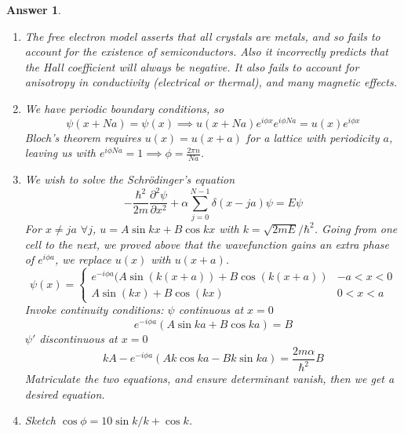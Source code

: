 \documentclass[a4paper]{article}
\newtheorem{ans}{Answer}[subsection]
\theoremstyle{new}
\begin{document}
\begin{ans}\leavevmode
\begin{enumerate}[label=(\alph*)]
\item The free electron model asserts that all crystals are metals, and so fails to account for the existence of semiconductors. Also it incorrectly predicts that the Hall coefficient will always be negative. It also fails to account for anisotropy in conductivity (electrical or thermal), and many magnetic effects. 
\item We have periodic boundary conditions, so
$$\psi(x+Na)=\psi(x)\implies u(x+Na)e^{i\phi x}e^{i\phi Na}=u(x)e^{i\phi x}$$
Bloch's theorem requires $u(x)=u(x+a)$ for a lattice with periodicity $a$, leaving us with $e^{i\phi Na}=1\implies\phi=\frac{2\pi n}{Na}$.
\item We wish to solve the Schr\"{o}dinger's equation
$$-\frac{\hbar^2}{2m}\frac{\partial^2\psi}{\partial x^2}+\alpha\sum_{j=0}^{N-1}\delta(x-ja)\psi=E\psi$$
For $x\neq ja$ $\forall j$, $u=A\sin kx+B\cos kx$ with $k=\sqrt{2mE}/\hbar^2$. Going from one cell to the next, we proved above that the wavefunction gains an extra phase of $e^{i\phi a}$, we replace $u(x)$ with $u(x+a)$.
$$\psi(x)=
\left\{
        \begin{array}{ll}
      e^{-i\phi a}(A\sin (k(x+a))+B\cos(k(x+a)) & -a<x<0 \\
      A\sin(kx)+B\cos(kx) & 0<x<a
      \end{array}
    \right.$$
Invoke continuity conditions: $\psi$ continuous at $x=0$
$$e^{-i\phi a}(A\sin ka+B\cos ka)=B$$
$\psi'$ discontinuous at $x=0$
$$kA-e^{-i\phi a}(Ak\cos ka-Bk\sin ka)=\frac{2m\alpha}{\hbar^2}B$$
Matriculate the two equations, and ensure determinant vanish, then we get a desired equation.
\item Sketch $\cos\phi=10\sin k/k+\cos k$.
\end{enumerate}
\begin{center}
\end{center}
\end{ans}
\end{document}
